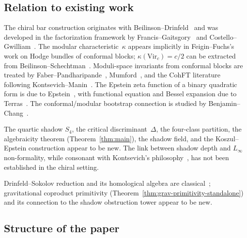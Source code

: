 \documentclass[11pt,reqno]{amsart}
\theoremstyle{definition}
\theoremstyle{remark}
\newcommand{\Vir}{\mathrm{Vir}}
\numberwithin{equation}{section}
\begin{document}
\subsection{Relation to existing work}

The chiral bar construction originates with
Beilinson--Drinfeld~\cite{BD04} and was developed in the
factorization framework by Francis--Gaitsgory~\cite{FG12}
and Costello--Gwilliam~\cite{CG17}.
The modular characteristic~$\kappa$ appears implicitly in
Feigin--Fuchs's work on Hodge bundles of conformal blocks;
$\kappa(\Vir_c) = c/2$ can be extracted from
Beilinson--Schechtman~\cite{BS88}.
Moduli-space invariants from conformal blocks are treated by
Faber--Pandharipande~\cite{FP00}, Mumford~\cite{Mumford83}, and
the CohFT literature following
Kontsevich--Manin~\cite{KM94}. The Epstein zeta function
of a binary quadratic form is due to Epstein~\cite{Epstein1903},
with functional equation and Bessel expansion due
to Terras~\cite{Terras73}. The conformal/modular bootstrap
connection is studied by Benjamin--Chang~\cite{BenjaminChang22}.

The quartic shadow $S_4$, the critical discriminant~$\Delta$,
the four-class partition, the algebraicity theorem
(Theorem~\ref{thm:main}), the shadow field, and the
Koszul--Epstein construction appear to be new. The link
between shadow depth and $L_\infty$ non-formality, while
consonant with Kontsevich's philosophy~\cite{Kontsevich03},
has not been established in the chiral setting.

Drinfeld--Sokolov reduction and its homological algebra are
classical~\cite{KRW03, FF90, DS85};
gravitational coproduct primitivity
(Theorem~\ref{thm:grav-primitivity-standalone}) and its connection to the
shadow obstruction tower appear to be new.

\subsection{Structure of the paper}
\end{document}
